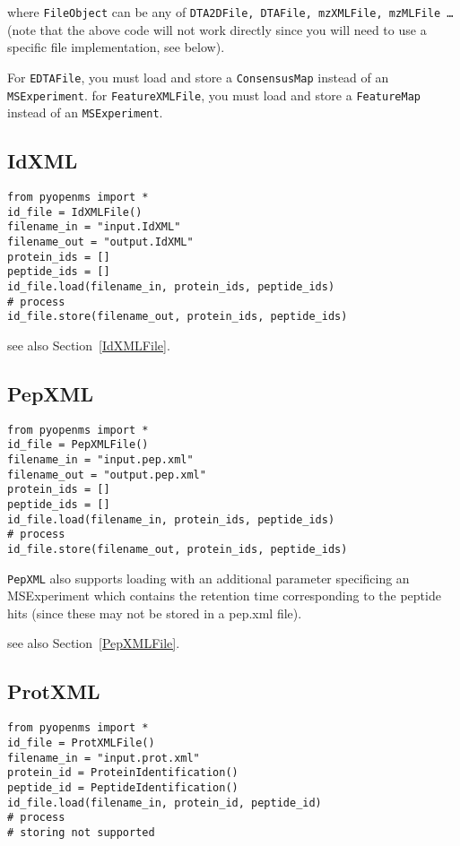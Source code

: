 \documentclass[10pt]{article}
\begin{document}
where \texttt{FileObject} can be any of \texttt{DTA2DFile, DTAFile, mzXMLFile,
mzMLFile \ldots } (note that the above code will not work directly since
you will need to use a specific file implementation, see below).  

For \texttt{EDTAFile}, you must load and store a \texttt{ConsensusMap} instead
of an \texttt{MSExperiment}.
for \texttt{FeatureXMLFile}, you must load and store a \texttt{FeatureMap} instead
of an \texttt{MSExperiment}.


\subsection{IdXML}
\begin{verbatim}
from pyopenms import *
id_file = IdXMLFile()
filename_in = "input.IdXML"
filename_out = "output.IdXML"
protein_ids = []
peptide_ids = []
id_file.load(filename_in, protein_ids, peptide_ids)
# process
id_file.store(filename_out, protein_ids, peptide_ids)
\end{verbatim}

see also Section~\ref{IdXMLFile}.

\subsection{PepXML}
\begin{verbatim}
from pyopenms import *
id_file = PepXMLFile()
filename_in = "input.pep.xml"
filename_out = "output.pep.xml"
protein_ids = []
peptide_ids = []
id_file.load(filename_in, protein_ids, peptide_ids)
# process
id_file.store(filename_out, protein_ids, peptide_ids)
\end{verbatim}

\texttt{PepXML} also supports loading with an additional parameter specificing
an MSExperiment which contains the retention time corresponding to the peptide
hits (since these may not be stored in a pep.xml file).

see also Section~\ref{PepXMLFile}.

\subsection{ProtXML}
\begin{verbatim}
from pyopenms import *
id_file = ProtXMLFile()
filename_in = "input.prot.xml"
protein_id = ProteinIdentification()
peptide_id = PeptideIdentification()
id_file.load(filename_in, protein_id, peptide_id)
# process
# storing not supported
\end{verbatim}
\end{document}
